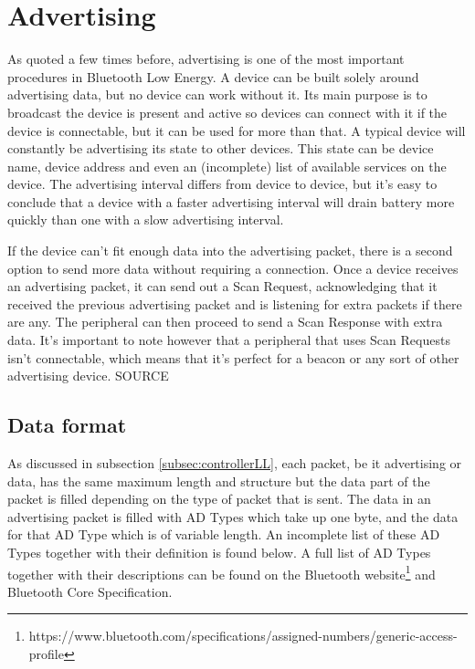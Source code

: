 \documentclass[pdftex,a4paper,12pt,twoside]{report}
\begin{document}
\section{Advertising}
\label{sec:advertising}
As quoted a few times before, advertising is one of the most important procedures in Bluetooth Low Energy. A device can be built solely around advertising data, but no device can work without it. Its main purpose is to broadcast the device is present and active so devices can connect with it if the device is connectable, but it can be used for more than that. A typical device will constantly be advertising its state to other devices. This state can be device name, device address and even an (incomplete) list of available services on the device. The advertising interval differs from device to device, but it's easy to conclude that a device with a faster advertising interval will drain battery more quickly than one with a slow advertising interval.

If the device can't fit enough data into the advertising packet, there is a second option to send more data without requiring a connection. Once a device receives an advertising packet, it can send out a Scan Request, acknowledging that it received the previous advertising packet and is listening for extra packets if there are any. The peripheral can then proceed to send a Scan Response with extra data. \colorbox[rgb]{0.2,0.8,0.2}{It's important to note however that a peripheral that uses Scan Requests isn't connectable,} \colorbox[rgb]{0.2,0.8,0.2}{which means that it's perfect for a beacon or any sort of other advertising device.} SOURCE

\subsection{Data format}
\label{subsec:advdataformat}
As discussed in subsection \ref{subsec:controllerLL}, each packet, be it advertising or data, has the same maximum length and structure but the data part of the packet is filled depending on the type of packet that is sent. The data in an advertising packet is filled with AD Types which take up one byte, and the data for that AD Type which is of variable length. An incomplete list of these AD Types together with their definition is found below. A full list of AD Types together with their descriptions can be found on the Bluetooth website\footnote{https://www.bluetooth.com/specifications/assigned-numbers/generic-access-profile} and Bluetooth Core Specification.
\end{document}
